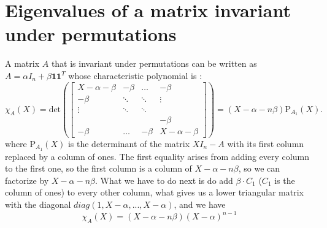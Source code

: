 \documentclass{amsart}
\begin{document}
\section{Eigenvalues of a matrix invariant under permutations}
 \label{eigen}
 A matrix $A$ that is invariant under permutations can be written as $A=\alpha I_n + \beta \mathbf{1}\mathbf{1}^T$ whose characteristic polynomial is :
$$\chi_A(X)=\text{det}(\begin{bmatrix}
    X- \alpha - \beta & -\beta&\hdots&-\beta \\
    -\beta & \ddots &\ddots&\vdots \\
    \vdots &\ddots &\ddots&   \\
    &&&-\beta\\
    -\beta&\hdots&-\beta&X-\alpha-\beta
\end{bmatrix})=(X-\alpha-n\beta)\text{P}_{A_1}\left(X\right).$$
where $\text{P}_{A_1}\left(X\right)$ is the determinant of the matrix $XI_n-A$ with its first column replaced by a column of ones. The first equality arises from adding every column to the first one, so the first column is a column of $X-\alpha-n\beta$, so we can factorize by $X-\alpha-n\beta$. What we have to do next is do add $\beta\cdot C_1$ ($C_1$ is the column of ones) to every other column, what gives us a lower triangular matrix with the diagonal $diag(1,X-\alpha,...,X-\alpha)$, and we have $$
\chi_A(X)=(X-\alpha-n\beta)(X-\alpha)^{n-1}$$
\end{document}
